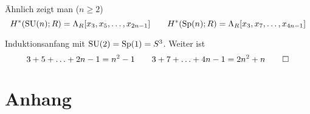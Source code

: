 \begin{bemerkung*}
	Ähnlich zeigt man ($n \ge 2$)
	\[
		H^* \enbrace*{\SU(n);R} = \Lambda_R\benbrace*{x_3, x_5, \ldots , x_{2n-1}} \qquad H^* \enbrace*{\Sp(n);R} = \Lambda_R \benbrace*{x_3, x_7, \ldots , x_{4n-1}}
	\]
\end{bemerkung*}
\begin{beweis}[name={Skizze}]
	Induktionsanfang mit $\operatorname{SU}(2) = \operatorname{Sp}(1) = S^3$. Weiter ist 
	\[
		3+5+ \ldots + 2n - 1 = n^2 -1 \qquad 3+7+ \ldots + 4n-1 = 2n^2 +n \qedhere
	\]
\end{beweis}

\cleardoubleoddemptypage
{}
\setcounter{page}{1}
\cleardoubleoddemptypage
\appendix

\chapter{Anhang} %
\label{sec:anhang}

\printindex
\printbibliography
\listoffigures
{}\todototoc

